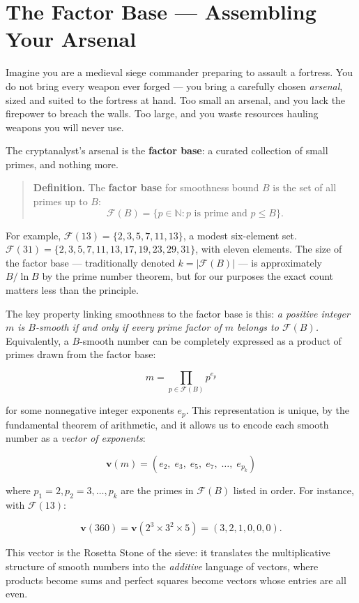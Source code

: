 \documentclass[11pt,twoside,openright]{book}
\theoremstyle{definition}
\theoremstyle{remark}
\begin{document}
\section{The Factor Base --- Assembling Your Arsenal}

Imagine you are a medieval siege commander preparing to assault a fortress. You do not bring every weapon ever forged --- you bring a carefully chosen \textit{arsenal}, sized and suited to the fortress at hand. Too small an arsenal, and you lack the firepower to breach the walls. Too large, and you waste resources hauling weapons you will never use.

The cryptanalyst's arsenal is the \textbf{factor base}: a curated collection of small primes, and nothing more.

\begin{quote}
\textbf{Definition.} The \textbf{factor base} for smoothness bound $B$ is the set of all primes up to $B$:
$$\mathcal{F}(B) = \{ p \in \mathbb{N} : p \text{ is prime and } p \leq B \}.$$
\end{quote}
For example, $\mathcal{F}(13) = \{2, 3, 5, 7, 11, 13\}$, a modest six-element set. $\mathcal{F}(31) = \{2, 3, 5, 7, 11, 13, 17, 19, 23, 29, 31\}$, with eleven elements. The size of the factor base --- traditionally denoted $k = |\mathcal{F}(B)|$ --- is approximately $B / \ln B$ by the prime number theorem, but for our purposes the exact count matters less than the principle.

The key property linking smoothness to the factor base is this: \textit{a positive integer $m$ is $B$-smooth if and only if every prime factor of $m$ belongs to $\mathcal{F}(B)$.} Equivalently, a $B$-smooth number can be completely expressed as a product of primes drawn from the factor base:

\[m = \prod_{p \in \mathcal{F}(B)} p^{e_p}\]

for some nonneg­ative integer exponents $e_p$. This representation is unique, by the fundamental theorem of arithmetic, and it allows us to encode each smooth number as a \textit{vector of exponents}:

\[\mathbf{v}(m) = (e_2, \; e_3, \; e_5, \; e_7, \; \ldots, \; e_{p_k})\]

where $p_1 = 2, p_2 = 3, \ldots, p_k$ are the primes in $\mathcal{F}(B)$ listed in order. For instance, with $\mathcal{F}(13)$:

\[\mathbf{v}(360) = \mathbf{v}(2^3 \times 3^2 \times 5) = (3, 2, 1, 0, 0, 0).\]

This vector is the Rosetta Stone of the sieve: it translates the multiplicative structure of smooth numbers into the \textit{additive} language of vectors, where products become sums and perfect squares become vectors whose entries are all even.
\end{document}
